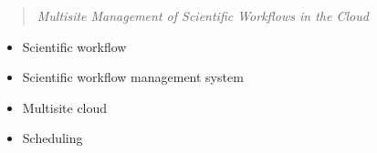 \begin{quote}
  \textit{Multisite Management of Scientific Workflows in the Cloud}
\end{quote}


\begin{itemize}
 \item Scientific workflow
 \item Scientific workflow management system
 \item Multisite cloud
 \item Scheduling

\end{itemize}

